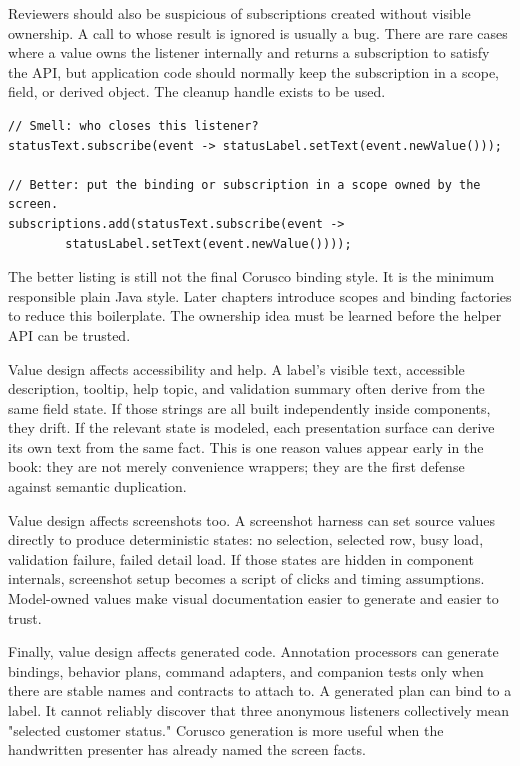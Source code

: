 Reviewers should also be suspicious of subscriptions created without visible
ownership. A call to  whose result is ignored is usually a bug.
There are rare cases where a value owns the listener internally and returns a
subscription to satisfy the API, but application code should normally keep the
subscription in a scope, field, or derived object. The cleanup handle exists to
be used.

\begin{lstlisting}[caption={Ignoring a subscription hides lifecycle.}]
// Smell: who closes this listener?
statusText.subscribe(event -> statusLabel.setText(event.newValue()));

// Better: put the binding or subscription in a scope owned by the screen.
subscriptions.add(statusText.subscribe(event ->
        statusLabel.setText(event.newValue())));
\end{lstlisting}

The better listing is still not the final Corusco binding style. It is the
minimum responsible plain Java style. Later chapters introduce scopes and
binding factories to reduce this boilerplate. The ownership idea must be learned
before the helper API can be trusted.

Value design affects accessibility and help. A label's visible text, accessible
description, tooltip, help topic, and validation summary often derive from the
same field state. If those strings are all built independently inside
components, they drift. If the relevant state is modeled, each presentation
surface can derive its own text from the same fact. This is one reason values
appear early in the book: they are not merely convenience wrappers; they are the
first defense against semantic duplication.

Value design affects screenshots too. A screenshot harness can set source
values directly to produce deterministic states: no selection, selected row,
busy load, validation failure, failed detail load. If those states are hidden in
component internals, screenshot setup becomes a script of clicks and timing
assumptions. Model-owned values make visual documentation easier to generate and
easier to trust.

Finally, value design affects generated code. Annotation processors can generate
bindings, behavior plans, command adapters, and companion tests only when there
are stable names and contracts to attach to. A generated plan can bind
 to a label. It cannot reliably discover that three anonymous
listeners collectively mean "selected customer status." Corusco generation is
more useful when the handwritten presenter has already named the screen facts.

